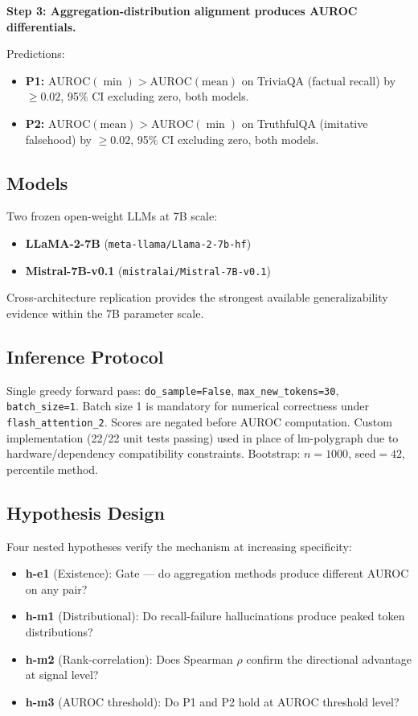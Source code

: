 \textbf{Step 3: Aggregation-distribution alignment produces AUROC differentials.}

Predictions:
\begin{itemize}
\item \textbf{P1:} $\text{AUROC}(\min) > \text{AUROC}(\text{mean})$ on TriviaQA (factual recall) by $\geq 0.02$, 95\% CI excluding zero, both models.
\item \textbf{P2:} $\text{AUROC}(\text{mean}) > \text{AUROC}(\min)$ on TruthfulQA (imitative falsehood) by $\geq 0.02$, 95\% CI excluding zero, both models.
\end{itemize}

\subsection{Models}

Two frozen open-weight LLMs at 7B scale:
\begin{itemize}
\item \textbf{LLaMA-2-7B} (\texttt{meta-llama/Llama-2-7b-hf})
\item \textbf{Mistral-7B-v0.1} (\texttt{mistralai/Mistral-7B-v0.1})
\end{itemize}

Cross-architecture replication provides the strongest available generalizability evidence within the 7B parameter scale.

\subsection{Inference Protocol}

Single greedy forward pass: \texttt{do\_sample=False}, \texttt{max\_new\_tokens=30}, \texttt{batch\_size=1}. Batch size 1 is mandatory for numerical correctness under \texttt{flash\_attention\_2}. Scores are negated before AUROC computation. Custom implementation (22/22 unit tests passing) used in place of lm-polygraph due to hardware/dependency compatibility constraints. Bootstrap: $n{=}1000$, seed$=42$, percentile method.

\subsection{Hypothesis Design}

Four nested hypotheses verify the mechanism at increasing specificity:
\begin{itemize}
\item \textbf{h-e1} (Existence): Gate --- do aggregation methods produce different AUROC on any pair?
\item \textbf{h-m1} (Distributional): Do recall-failure hallucinations produce peaked token distributions?
\item \textbf{h-m2} (Rank-correlation): Does Spearman $\rho$ confirm the directional advantage at signal level?
\item \textbf{h-m3} (AUROC threshold): Do P1 and P2 hold at AUROC threshold level?
\end{itemize}
